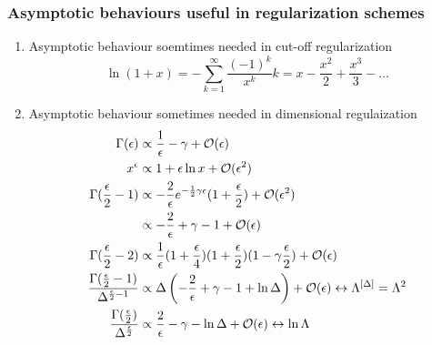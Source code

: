 \subsubsection{Asymptotic behaviours useful in regularization schemes}
\begin{enumerate}
	\item Asymptotic behaviour soemtimes needed in cut-off regularization
	\begin{equation}
		\ln(1+x) = -\sum_{k=1}^\infty \frac{(-1)^k}{x^k} k = x-\frac{x^2}{2} + \frac{x^3}{3 } - \dots
	\end{equation}
	\item Asymptotic behaviour sometimes needed in dimensional regulaization
	\begin{align}
		\Gamma(\epsilon)& \propto \frac{1}{ \epsilon} - \gamma + \mathcal{O}(\epsilon)\\
		x^\epsilon &\propto 1+\epsilon \ln x + \mathcal{O}( \epsilon^2)\\
		\Gamma (\frac{\epsilon}{2}-1) &\propto -\frac{2}{\epsilon} e^{-\frac{1}{2} \gamma \epsilon} (1+\frac{\epsilon}{2}) + \mathcal{O}(\epsilon^2) \nonumber \\
		&\propto -\frac{2}{\epsilon} + \gamma -1 + \mathcal{O}(\epsilon)\\
		\Gamma(\frac{\epsilon}{2}-2) &\propto \frac{1}{\epsilon} (1 + \frac{\epsilon}{4}) (1+\frac{\epsilon}{2}) (1 - \gamma \frac{\epsilon}{2}) + \mathcal{O}(\epsilon)\\
		\frac{\Gamma(\frac{\epsilon}{2} -1)}{\Delta^{\frac{\epsilon}{2}-1} } &\propto \Delta \left(-\frac{2}{\epsilon} + \gamma -1 +\ln \Delta\right) + \mathcal{O}(\epsilon) \leftrightarrow \Lambda^{[\Delta]} = \Lambda^2 \\
		\frac{\Gamma(\frac{\epsilon}{2})}{\Delta^{\frac{\epsilon}{2}}} &\propto \frac{2}{\epsilon} - \gamma - \ln \Delta + \mathcal{O}(\epsilon) \leftrightarrow \ln \Lambda
	\end{align}
\end{enumerate}


